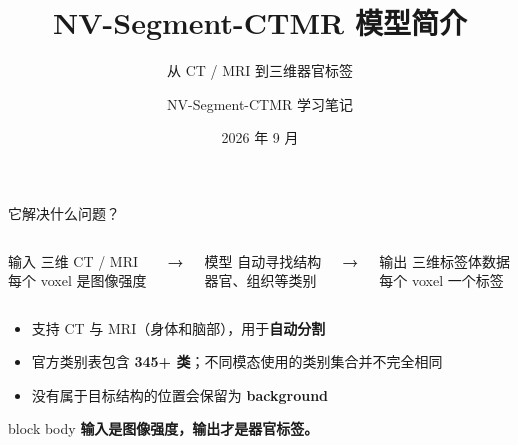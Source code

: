 \documentclass[aspectratio=169,12pt]{beamer}
\title[NV-Segment-CTMR]{NV-Segment-CTMR 模型简介}
\subtitle{从 CT / MRI 到三维器官标签}
\author[学习笔记]{NV-Segment-CTMR 学习笔记}
\institute[医学影像分割]{面向入门学习者的简明讲解}
\date[2026.09]{2026 年 9 月}
\newcommand{\key}[1]{\textcolor{BeamerRoyal}{\textbf{#1}}}
\newcommand{\takeaway}[1]{%
  \begin{beamercolorbox}[wd=\linewidth,sep=.16cm,center,rounded=true,shadow=true]{block body}
    \textcolor{BeamerDeep}{\textbf{#1}}
  \end{beamercolorbox}
}
\newcommand{\bigarrow}{\textcolor{BeamerRoyal}{\large\bfseries →}}
\begin{document}
\begin{frame}
  \titlepage
\end{frame}

\begin{frame}{它解决什么问题？}
  \vspace{0.12cm}
  \begin{columns}[c,onlytextwidth]
      \begin{block}{输入}
        \centering
        三维 CT / MRI\\[0.08cm]
        {\small 每个 voxel 是图像强度}
      \end{block}
    \centering\bigarrow
      \begin{block}{模型}
        \centering
        自动寻找结构\\[0.08cm]
        {\small 器官、组织等类别}
      \end{block}
    \centering\bigarrow
      \begin{block}{输出}
        \centering
        三维标签体数据\\[0.08cm]
        {\small 每个 voxel 一个标签}
      \end{block}
  \end{columns}

  \vspace{0.30cm}
  \begin{itemize}
    \item 支持 CT 与 MRI（身体和脑部），用于\key{自动分割}
    \item 官方类别表包含 \key{345+ 类}；不同模态使用的类别集合并不完全相同
    \item 没有属于目标结构的位置会保留为 \textbf{background}
  \end{itemize}
  \vfill
  \takeaway{输入是图像强度，输出才是器官标签。}
\end{frame}
\end{document}
